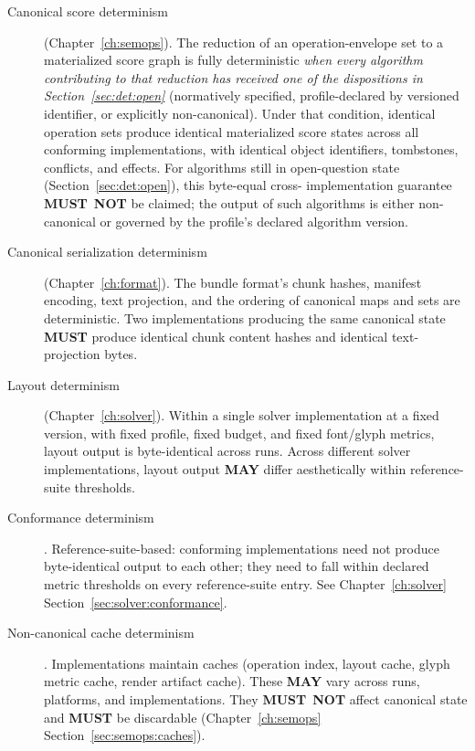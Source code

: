 \documentclass[11pt,letterpaper]{report}
\newcommand{\MUST}{\textbf{MUST}}
\newcommand{\MUSTNOT}{\textbf{MUST}\nobreak\ \textbf{NOT}}
\newcommand{\MAY}{\textbf{MAY}}
\begin{document}
\begin{description}
  \item[Canonical score determinism] (Chapter~\ref{ch:semops}).
    The reduction of an operation-envelope set to a materialized
    score graph is fully deterministic \emph{when every algorithm
    contributing to that reduction has received one of the
    dispositions in Section~\ref{sec:det:open}} (normatively
    specified, profile-declared by versioned identifier, or
    explicitly non-canonical). Under that condition, identical
    operation sets produce identical materialized score states
    across all conforming implementations, with identical object
    identifiers, tombstones, conflicts, and effects. For
    algorithms still in open-question state
    (Section~\ref{sec:det:open}), this byte-equal cross-
    implementation guarantee \MUSTNOT{} be claimed; the output
    of such algorithms is either non-canonical or governed by the
    profile's declared algorithm version.
  \item[Canonical serialization determinism]
    (Chapter~\ref{ch:format}). The bundle format's chunk hashes,
    manifest encoding, text projection, and the ordering of
    canonical maps and sets are deterministic. Two implementations
    producing the same canonical state \MUST{} produce identical
    chunk content hashes and identical text-projection bytes.
  \item[Layout determinism] (Chapter~\ref{ch:solver}). Within a
    single solver implementation at a fixed version, with fixed
    profile, fixed budget, and fixed font/glyph metrics, layout
    output is byte-identical across runs. Across different solver
    implementations, layout output \MAY{} differ aesthetically
    within reference-suite thresholds.
  \item[Conformance determinism]. Reference-suite-based:
    conforming implementations need not produce byte-identical
    output to each other; they need to fall within declared
    metric thresholds on every reference-suite entry. See
    Chapter~\ref{ch:solver} Section~\ref{sec:solver:conformance}.
  \item[Non-canonical cache determinism]. Implementations
    maintain caches (operation index, layout cache, glyph metric
    cache, render artifact cache). These \MAY{} vary across
    runs, platforms, and implementations. They \MUSTNOT{} affect
    canonical state and \MUST{} be discardable
    (Chapter~\ref{ch:semops} Section~\ref{sec:semops:caches}).
\end{description}
\end{document}
